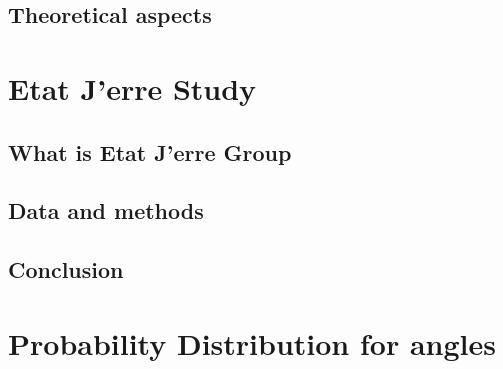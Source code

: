 \documentclass{beamer}\usepackage[]{graphicx}\usepackage[]{color}
\begin{document}
\subsection{Theoretical aspects}
\section{Etat J'erre Study}

\subsection{What is Etat J'erre Group}
\subsection{Data and methods}
\subsection{Conclusion}

\appendix
\section{Probability Distribution for angles}

\end{document}
